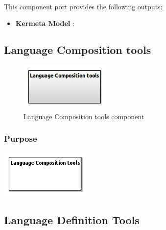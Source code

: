 \documentclass{gemoc} %
\begin{document}
This component port provides the following outputs:
\begin{itemize}
  \item \textbf{Kermeta Model} :
\end{itemize}

\subsection{Language Composition tools}

\begin{figure}[htp]
	\begin{center}
	\includegraphics*[trim=0.0cm 0.0cm 0cm 0.0cm, clip=true, scale=1.0]{../images/generated/Generated_Language Composition tools.jpg}
	\caption{Language Composition tools component}
	\end{center}
\end{figure}

\subsubsection{Purpose}

\begin{center}
\includegraphics*[trim=0.0cm 0.0cm 0cm 0.0cm, clip=true]{../images/generated/Generated_Language_Composition_tools.png}
\end{center}



\subsection{Language Definition Tools}
\end{document}
